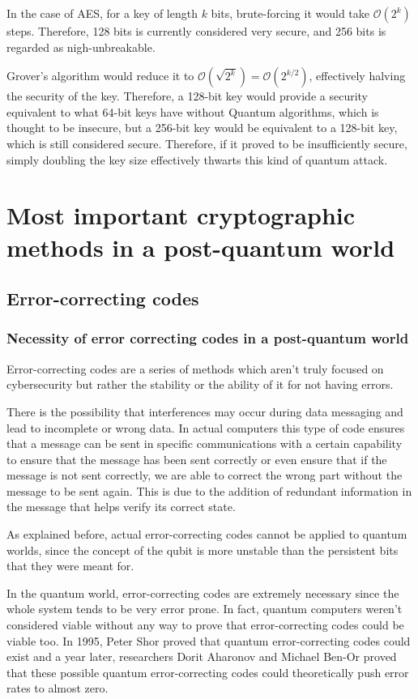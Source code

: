 In the case of AES, for a key of length $k$ bits, brute-forcing it would take
$\mathcal{O}(2^k)$ steps. Therefore, 128 bits is currently considered very
secure, and 256 bits is regarded as nigh-unbreakable.

Grover's algorithm would reduce it to $\mathcal{O}\left(\sqrt{2^k}\right) =
\mathcal{O}\left({2^{k/2}}\right) $, effectively halving the security of the
key. Therefore, a 128-bit key would provide a security equivalent to what 64-bit
keys have without Quantum algorithms, which is thought to be insecure, but a
256-bit key would be equivalent to a 128-bit key, which is still considered
secure. Therefore, if it proved to be insufficiently secure, simply doubling the
key size effectively thwarts this kind of quantum attack.


\pagebreak
\section{Most important cryptographic methods in a post-quantum world}

\subsection{Error-correcting codes}
\subsubsection{Necessity of error correcting codes in a post-quantum world}

Error-correcting codes are a series of methods which aren't truly focused on
cybersecurity but rather the stability or the ability of it for not having
errors.

There is the possibility that interferences may occur during data messaging and
lead to incomplete or wrong data. In actual computers this type of code ensures
that a message can be sent in specific communications with a certain capability
to ensure that the message has been sent correctly or even ensure that if the
message is not sent correctly, we are able to correct the wrong part without the
message to be sent again. This is due to the addition of redundant information
in the message that helps verify its correct state.

As explained before, actual error-correcting codes cannot be applied to quantum
worlds, since the concept of the qubit is more unstable than the persistent bits
that they were meant for.

In the quantum world, error-correcting codes are extremely necessary since the
whole system tends to be very error prone. In fact, quantum computers weren't
considered viable without any way to prove that error-correcting codes could be
viable too. In 1995, Peter Shor proved that quantum error-correcting codes could
exist and a year later, researchers Dorit Aharonov and Michael Ben-Or proved
that these possible quantum error-correcting codes could theoretically push
error rates to almost zero.

